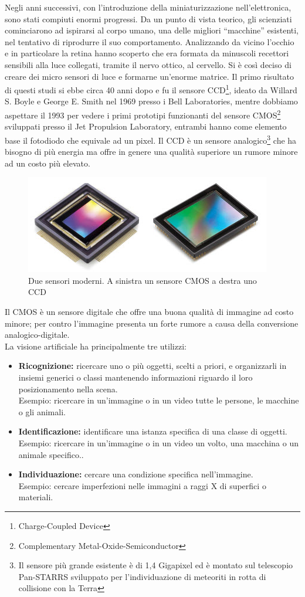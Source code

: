 Negli anni successivi, con l'introduzione della miniaturizzazione nell'elettronica, 
sono stati compiuti enormi progressi. Da un punto di vista teorico, gli scienziati 
cominciarono ad ispirarsi al corpo umano, una delle migliori ``macchine'' esistenti, 
nel tentativo di riprodurre il suo comportamento. Analizzando da vicino
l'occhio e in particolare la retina hanno scoperto che era formata da minuscoli 
recettori sensibili alla luce collegati, tramite il nervo ottico, al cervello. 
Si è così deciso di creare dei 
micro sensori di luce e formarne un'enorme matrice. Il primo risultato di questi studi 
si ebbe circa 40 anni dopo e fu il sensore CCD\footnote{Charge-Coupled Device}, 
ideato da Willard S. Boyle e George E. Smith nel 1969 presso i Bell Laboratories,
mentre dobbiamo aspettare il 1993 per vedere i primi prototipi funzionanti del 
sensore CMOS\footnote{Complementary Metal-Oxide-Semiconductor} sviluppati presso 
il Jet Propulsion Laboratory, entrambi hanno come elemento base il fotodiodo che 
equivale ad un pixel. Il CCD è un sensore 
analogico\footnote{Il sensore più grande esistente è di 1,4 Gigapixel ed è 
montato sul telescopio Pan-STARRS sviluppato per l'individuazione di meteoriti in
 rotta di collisione con la Terra} che ha bisogno di più energia 
ma offre in genere una qualità superiore un rumore minore ad un costo più elevato.\\
\begin{figure}[!htb] \center
\includegraphics[scale=0.8]{immagini/ccd-cmos.png}
\caption{Due sensori moderni. A sinistra un sensore CMOS a destra uno CCD} 
\end{figure}
Il CMOS è un sensore digitale che offre una buona qualità di immagine ad costo minore;
per contro l'immagine presenta un forte rumore a causa della conversione 
analogico-digitale.\\
La visione artificiale ha principalmente tre utilizzi:
\begin{itemize}
\item \textbf{Ricognizione:} ricercare uno o più oggetti, scelti a priori, e organizzarli in 
insiemi generici o classi mantenendo informazioni riguardo il loro posizionamento 
nella scena. \\Esempio: ricercare in un'immagine o in un video tutte le persone, 
le macchine o gli animali. 
\item \textbf{Identificazione:} identificare una istanza specifica di una classe 
di oggetti. \\Esempio: ricercare in un'immagine o in un video un volto, 
una macchina o un animale specifico.. 
\item \textbf{Individuazione:} cercare una condizione specifica nell'immagine. 
\\Esempio: cercare imperfezioni nelle immagini a raggi X di superfici o materiali.
\end{itemize}
